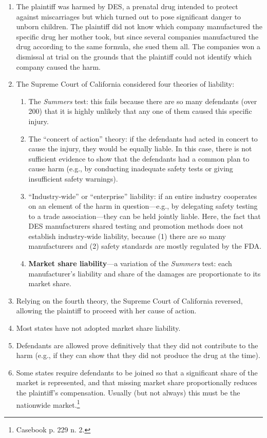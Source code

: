 \begin{enumerate}
    \item The plaintiff was harmed by DES, a prenatal drug intended to protect against miscarriages but which turned out to pose significant danger to unborn children. The plaintiff did not know which company manufactured the specific drug her mother took, but since several companies manufactured the drug according to the same formula, she sued them all. The companies won a dismissal at trial on the grounds that the plaintiff could not identify which company caused the harm.
    \item The Supreme Court of California considered four theories of liability:
    \begin{enumerate}
        \item The \emph{Summers} test: this fails because there are so many defendants (over 200) that it is highly unlikely that any one of them caused this specific injury.
        \item The ``concert of action'' theory: if the defendants had acted in concert to cause the injury, they would be equally liable. In this case, there is not sufficient evidence to show that the defendants had a common plan to cause harm (e.g., by conducting inadequate safety tests or giving insufficient safety warnings).
        \item ``Industry-wide'' or ``enterprise'' liability: if an entire industry cooperates on an element of the harm in question---e.g., by delegating safety testing to a trade association---they can be held jointly liable. Here, the fact that DES manufacturers shared testing and promotion methods does not establish industry-wide liability, because (1) there are so many manufacturers and (2) safety standards are mostly regulated by the FDA.
        \item \textbf{Market share liability}---a variation of the \emph{Summers} test: each manufacturer's liability and share of the damages are proportionate to its market share.
    \end{enumerate}
    \item Relying on the fourth theory, the Supreme Court of California reversed, allowing the plaintiff to proceed with her cause of action.
    \item Most states have not adopted market share liability.
    \item Defendants are allowed prove definitively that they did not contribute to the harm (e.g., if they can show that they did not produce the drug at the time).
    \item Some states require defendants to be joined so that a significant share of the market is represented, and that missing market share proportionally reduces the plaintiff's compensation. Usually (but not always) this must be the nationwide market.\footnote{Casebook p. 229 n. 2.}
\end{enumerate}

